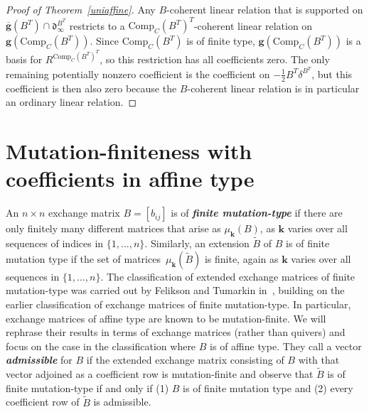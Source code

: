 \documentclass{amsart}
\theoremstyle{definition}
\theoremstyle{remark}
\numberwithin{equation}{section}
\newcommand{\newword}[1]{\textbf{\emph{#1}}}
\newcommand{\set}[1]{{\lbrace #1 \rbrace}}
\newcommand{\0}{{\mathbf{0}}}
\newcommand{\Comp}{\mathrm{Comp}_C}
\newcommand{\g}{\mathbf{g}}
\newcommand{\gp}{\overline{\g}}
\newcommand{\kk}{{\boldsymbol{k}}}
\newcommand{\tB}{{\widetilde{B}}}
\renewcommand{\d}{{\mathfrak d}}
\begin{document}
\begin{proof}[Proof of Theorem~\ref{uniaffine}]
Any $B$-coherent linear relation that is supported on $\gp(B^T)\cap\d^{B^T}_\infty$ restricts to a $\Comp(B^T)^T$-coherent linear relation on $\g(\Comp(B^T))$.
Since $\Comp(B^T)$ is of finite type, $\g(\Comp(B^T))$ is a basis for $R^{\Comp(B^T)^T}$, so this restriction has all coefficients zero.
The only remaining potentially nonzero coefficient is the coefficient on $-\frac12B^T\delta^{B^T}$, but this coefficient is then also zero because the $B$-coherent linear relation is in particular an ordinary linear relation.
\end{proof}

\section{Mutation-finiteness with coefficients in affine type}
An $n\times n$ exchange matrix $B=[b_{ij}]$ is of \newword{finite mutation-type} if there are only finitely many different matrices that arise as $\mu_\kk(B)$, as $\kk$ varies over all sequences of indices in $\set{1,\ldots,n}$.
Similarly, an extension $\tB$ of $B$ is of finite mutation type if the set of matrices~$\mu_\kk(\tB)$ is finite, again as $\kk$ varies over all sequences in $\set{1,\ldots,n}$.
The classification of extended exchange matrices of finite mutation-type was carried out by Felikson and Tumarkin in~\cite{FeTuCoeff}, building on the earlier classification of exchange matrices of finite mutation-type.
In particular, exchange matrices of affine type are known to be mutation-finite.
We will rephrase their results in terms of exchange matrices (rather than quivers) and focus on the case in the classification where $B$ is of affine type.
They call a vector \newword{admissible} for $B$ if the extended exchange matrix consisting of $B$ with that vector adjoined as a coefficient row is mutation-finite and observe that $\tB$ is of finite mutation-type if and only if (1) $B$ is of finite mutation type and (2) every coefficient row of $\tB$ is admissible.
\end{document}
